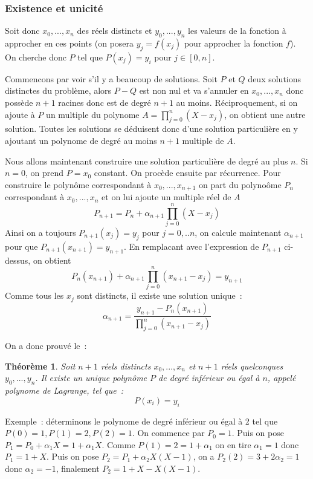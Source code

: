 \documentclass[a4paper,11pt]{article}
\newtheorem{thm}{Théorème}
\begin{document}
\begin{giacjshere}
\subsubsection{Existence et unicit\'e}
Soit donc $x_0,...,x_n$ des r\'eels distincts et $y_0,...,y_n$
les valeurs de la fonction \`a approcher en ces points (on posera
$y_j=f(x_j)$ pour approcher la fonction $f$). On cherche
donc $P$ tel que $P(x_j)=y_i$ pour $j \in [0,n]$.

Commencons par voir s'il y a beaucoup de solutions. Soit $P$ et $Q$
deux solutions distinctes du probl\`eme, alors $P-Q$ est non nul
et va s'annuler en $x_0, ...,x_n$ donc poss\`ede $n+1$ racines donc
est de degr\'e $n+1$ au moins. R\'eciproquement, si on ajoute
\`a $P$ un multiple du polynome $A=\prod_{j=0}^n (X-x_j)$, on obtient
une autre solution. Toutes les solutions se d\'eduisent donc
d'une solution particuli\`ere en y ajoutant un polynome de degr\'e
au moins $n+1$ multiple de $A$. 

Nous allons maintenant construire
une solution particuli\`ere de degr\'e au plus $n$.
Si $n=0$, on prend $P=x_0$ constant. On proc\`ede ensuite par
r\'ecurrence. Pour construire le polyn\^ome correspondant
\`a $x_0,...,x_{n+1}$ on part du polyno\^ome $P_n$ correspondant \`a
$x_0,...,x_{n}$ et on lui ajoute un multiple r\'eel de $A$
\[ P_{n+1}=P_n+ \alpha_{n+1} \prod_{j=0}^n (X-x_j) \]
Ainsi on a toujours $P_{n+1}(x_j)=y_j$ pour $j=0,..n$, on calcule
maintenant $ \alpha_{n+1}$ pour que $P_{n+1}(x_{n+1})=y_{n+1}$.
En remplacant avec l'expression de $P_{n+1}$ ci-dessus, on obtient
\[ P_n(x_{n+1})+  \alpha_{n+1} \prod_{j=0}^n (x_{n+1}-x_j) = y_{n+1} \]
Comme tous les $x_j$ sont distincts, il existe une solution unique~:
\[  \alpha_{n+1}=\frac{y_{n+1}-P_n(x_{n+1})}{\prod_{j=0}^n (x_{n+1}-x_j)}\]

On a donc prouv\'e le~:
\begin{thm}  
Soit $n+1$ r\'eels distincts $x_0,...,x_n$ et $n+1$
r\'eels quelconques $y_0,...,y_n$.
Il existe un unique polyn\^ome $P$ de degr\'e inf\'erieur ou \'egal \`a
$n$, appel\'e polynome de Lagrange, tel que~:
\[ P(x_i)=y_i\]
\end{thm}

Exemple~: d\'eterminons le polynome de degr\'e inf\'erieur ou \'egal
\`a 2 tel que $P(0)=1, P(1)=2, P(2)=1$. On commence par $P_0=1$.
Puis on pose $P_1=P_0+ \alpha_{1}X=1+ \alpha_{1}X$. 
Comme $P(1)=2=1+ \alpha_{1}$ on en tire $ \alpha_{1}=1$
donc $P_1=1+X$. Puis on pose $P_2=P_1+ \alpha_{2}X(X-1)$, on a 
$P_2(2)=3+2 \alpha_{2}=1$
donc $ \alpha_{2}=-1$, finalement $P_2=1+X-X(X-1)$.\\


\end{giacjshere}
\end{document}
